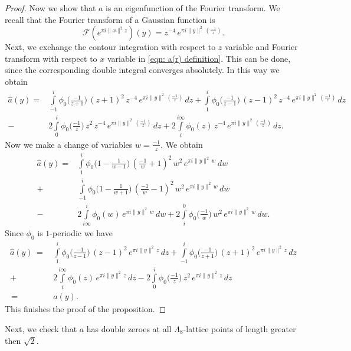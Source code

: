 \documentclass{scrartcl}
\newcommand{\R}{\mathbb{R}}
\begin{document}
\begin{proof}
Now we show that $a$ is an eigenfunction of the Fourier transform. We recall that the Fourier transform of a Gaussian function is
\begin{equation}\label{eqn: Gaussian Fourier}\mathcal{F}(e^{\pi i  \|x\|^2 z})(y)=z^{-4}\,e^{\pi i \|y\|^2 \,(\frac{-1}{z}) }.\end{equation}
Next, we exchange the contour integration with respect to $z$ variable and Fourier transform  with respect to $x$ variable in \eqref{eqn: a(r) definition}. This can be done, since the corresponding double integral converges absolutely. In this way we obtain
\begin{align*}
  \widehat{a}(y)=&\int\limits_{-1}^i\phi_0\Big(\frac{-1}{z+1}\Big)\,(z+1)^2\,z^{-4}\,e^{\pi i \|y\|^2 \,(\frac{-1}{z})}\,dz
  +\int\limits_{1}^i\phi_0\Big(\frac{-1}{z-1}\Big)\,(z-1)^2\,z^{-4}\,e^{\pi i \|y\|^2 \,(\frac{-1}{z})}\,dz\\
  -&2\int\limits_{0}^i\phi_0\Big(\frac{-1}{z}\Big)\,z^2\,z^{-4}\,e^{\pi i \|y\|^2 \,(\frac{-1}{z})}\,dz +2\int\limits_{i}^{i\infty}\phi_0(z)\,z^{-4}\,e^{\pi i \|y\|^2 \,(\frac{-1}{z})}\,dz.
\end{align*}
Now we make a change of variables $w=\frac{-1}{z}$. We obtain
\begin{align*}
  \widehat{a}(y)=&\int\limits_{1}^i\phi_0\Big(1-\frac{1}{w-1}\Big)\,(\frac{-1}{w}+1)^2\,w^{2}\,e^{\pi i \|y\|^2 \,w}\,dw\\
  +&\int\limits_{-1}^i\phi_0\Big(1-\frac{1}{w+1}\Big)\,(\frac{-1}{w}-1)^2\,w^2\,e^{\pi i \|y\|^2 \,w}\,dw\\
  -&2\int\limits_{i \infty}^i\phi_0(w)\,e^{\pi i \|y\|^2 \,w}\,dw +2\int\limits_{i}^{0}\phi_0\Big(\frac{-1}{w}\Big)\,w^{2}\,e^{\pi i \|y\|^2 \,w}\,dw.
\end{align*}
Since $\phi_0$ is $1$-periodic we have
\begin{align*}
  \widehat{a}(y)\,=\,&\int\limits_{1}^i\phi_0\Big(\frac{-1}{z-1}\Big)\,(z-1)^2\,e^{\pi i \|y\|^2 \,z}\,dz
  +\int\limits_{-1}^i\phi_0\Big(\frac{-1}{z+1}\Big)\,(z+1)^2\,e^{\pi i \|y\|^2 \,z}\,dz\\
  +&2\int\limits_{i}^{i\infty}\phi_0(z)\,e^{\pi i \|y\|^2 \,z}\,dz
  -2\int\limits_{0}^{i}\phi_0\Big(\frac{-1}{z}\Big)\,z^{2}\,e^{\pi i \|y\|^2 \,z}\,dz\\
  \,=\,&a(y).
\end{align*}
This finishes the proof of the proposition.
\end{proof}

Next, we check that $a$ has double zeroes at all $\Lambda_8$-lattice points of length greater then $\sqrt{2}$.
\end{document}
